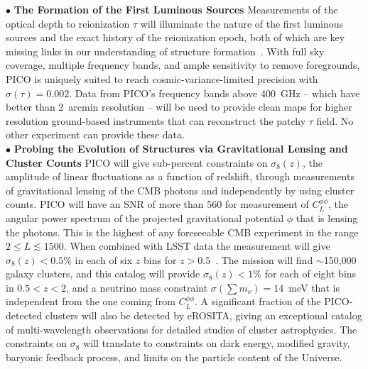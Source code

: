 \documentclass[PICOAPC.tex]{subfiles}
\begin{document}
 
$\bullet$ {\bf The Formation of the First Luminous Sources} \hspace{0.1in} \label{sec:luminoussources}  Measurements of the optical depth to reionization $\tau$ will illuminate the nature of the first luminous sources and the exact history of the reionization epoch, both of which are key missing links in our understanding of structure formation~\citep{alvarez_swp}.  With full sky coverage, multiple frequency bands, and ample sensitivity to remove foregrounds, PICO is uniquely suited to reach cosmic-variance-limited precision with $\sigma(\tau)=0.002$. Data from PICO's frequency bands above 400~GHz -- which have better than 2~arcmin resolution  -- will be used to provide clean maps for higher resolution ground-based instruments that can reconstruct the patchy $\tau$ field. No other experiment can provide these data. \\
%
$\bullet$ {\bf Probing the Evolution of Structures via Gravitational Lensing and Cluster Counts} \hspace{0.1in} \label{sec:gravitationallensing}   
PICO will give sub-percent constraints on $\sigma_8(z)$, the amplitude of linear fluctuations as a function of redshift, through measurements of gravitational lensing of the CMB photons and independently by using cluster counts. 
PICO will have an \ac{SNR} of more than 560 for measurement of $C_{L}^{\phi \phi}$, the angular power spectrum of the projected gravitational potential $\phi$ that is lensing the photons. This is the highest of any foreseeable CMB experiment in the range $2 \leq L \lesssim 1500$. When combined with LSST data the measurement will give $\sigma_8(z) <0.5\%$ in each of six $z$ bins for $z>0.5$~\cite{pico_report}.
The mission will find $\sim$150,000 galaxy clusters, and this catalog will provide $\sigma_{8}(z) < 1\%$ for each of eight bins in $0.5 < z < 2$, and a neutrino mass constraint $\sigma(\sum m_{\nu}) = 14$~meV that is independent from the one coming from $C_{L}^{\phi \phi}$. A significant fraction of the PICO-detected clusters will also be detected by eROSITA, giving an exceptional catalog of multi-wavelength observations for detailed studies of cluster astrophysics. The constraints on $\sigma_{8}$ will translate to constraints on dark energy, modified gravity, baryonic feedback process, and limits on the particle content of the Universe. \\
\end{document}
